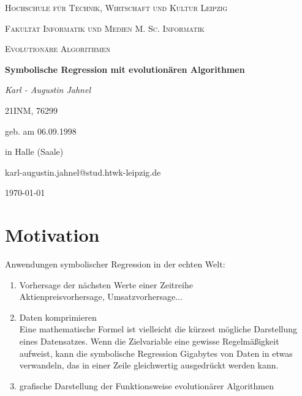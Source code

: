 \documentclass[ngerman]{article}
\begin{document}
\begin{titlepage}
	\begin{figure}
\hspace{8.0cm}
	\end{figure}

\centering
	{\scshape\LARGE Hochschule für Technik, Wirtschaft und Kultur Leipzig \par}
	\vspace{1cm}
	{\scshape\Large Fakultät Informatik und Medien M. Sc. Informatik \par}
	\vspace{0.5cm}
	{\scshape\Large Evolutionäre Algorithmen\par}
	\vspace{1.5cm}
	{\huge\bfseries Symbolische Regression mit evolutionären Algorithmen\par}
	\vspace{2cm}
	{\Large\itshape Karl - Augustin Jahnel\par21INM, 76299\par
		geb. am 06.09.1998 \par in Halle (Saale) \par karl-augustin.jahnel@stud.htwk-leipzig.de}
	\vfill
	
	{\large \today\par}
\end{titlepage}
\thispagestyle{fancy}
	\tableofcontents
	\newpage
	
	\section{Motivation}
	Anwendungen symbolischer Regression in der echten Welt:
	\begin{enumerate}
		\item Vorhersage der nächsten Werte einer Zeitreihe \\
		Aktienpreisvorhersage, Umsatzvorhersage...
		\item Daten komprimieren \\
		Eine mathematische Formel ist vielleicht die kürzest mögliche Darstellung eines Datensatzes. Wenn die Zielvariable eine gewisse Regelmäßigkeit aufweist, kann die symbolische Regression Gigabytes von Daten in etwas verwandeln, das in einer Zeile gleichwertig ausgedrückt werden kann.
		\item grafische Darstellung der Funktionsweise evolutionärer Algorithmen
	\end{enumerate}
	
\end{document}
